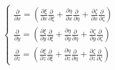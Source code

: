 \documentclass
[
a4paper,                      %
twoside,					  %
12pt,                         %
abstract,		      %
fleqn,                        %
]
{scrartcl} %
\begin{document}
\begin{description}
\begin{equation}
\begin{cases}
\frac{\partial}{\partial x}=\left(\frac{\partial\xi}{\partial x}\frac{\partial}{\partial\xi}+\frac{\partial\eta}{\partial x}\frac{\partial}{\partial\eta}+\frac{\partial\zeta}{\partial x}\frac{\partial}{\partial\zeta}\right)\\[5pt]
\frac{\partial}{\partial y}=\left(\frac{\partial\xi}{\partial y}\frac{\partial}{\partial\xi}+\frac{\partial\eta}{\partial y}\frac{\partial}{\partial\eta}+\frac{\partial\zeta}{\partial y}\frac{\partial}{\partial\zeta}\right)\\[5pt]
\frac{\partial}{\partial z}=\left(\frac{\partial\xi}{\partial z}\frac{\partial}{\partial\xi}+\frac{\partial\eta}{\partial z}\frac{\partial}{\partial\eta}+\frac{\partial\zeta}{\partial z}\frac{\partial}{\partial\zeta}\right)
\end{cases}
\end{equation}


\end{description}
\end{document}
